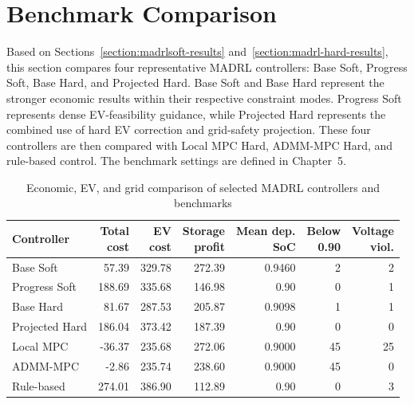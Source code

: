 \section{Benchmark Comparison}\label{section:madrl-best}

Based on Sections~\ref{section:madrlsoft-results} and~\ref{section:madrl-hard-results}, this section compares four representative MADRL controllers: Base Soft, Progress Soft, Base Hard, and Projected Hard. Base Soft and Base Hard represent the stronger economic results within their respective constraint modes. Progress Soft represents dense EV-feasibility guidance, while Projected Hard represents the combined use of hard EV correction and grid-safety projection. These four controllers are then compared with Local MPC Hard, ADMM-MPC Hard, and rule-based control. The benchmark settings are defined in Chapter~5.

\begin{table}[htbp]
  \centering
  \renewcommand{\arraystretch}{1.15}
  \caption{Economic, EV, and grid comparison of selected MADRL controllers and benchmarks}
  \label{tab:ch6-benchmark}
  \setlength{\tabcolsep}{2.5pt}
  \begin{tabular}{p{3.6cm}rrrrrr}
    \hline
    Controller & \shortstack{Total\\cost} & \shortstack{EV\\cost} & \shortstack{Storage\\profit} & \shortstack{Mean dep.\\SoC} & \shortstack{Below\\0.90} & \shortstack{Voltage\\viol.} \\
    \hline
    Base Soft & 57.39 & 329.78 & 272.39 & 0.9460 & 2 & 2 \\
    Progress Soft & 188.69 & 335.68 & 146.98 & 0.90 & 0 & 1 \\
    Base Hard & 81.67 & 287.53 & 205.87 & 0.9098 & 1 & 1 \\
    Projected Hard & 186.04 & 373.42 & 187.39 & 0.90 & 0 & 0 \\
    Local MPC & -36.37 & 235.68 & 272.06 & 0.9000 & 45 & 25 \\
    ADMM-MPC & -2.86 & 235.74 & 238.60 & 0.9000 & 45 & 0 \\
    Rule-based & 274.01 & 386.90 & 112.89 & 0.90 & 0 & 3 \\
    \hline
  \end{tabular}
\end{table}

